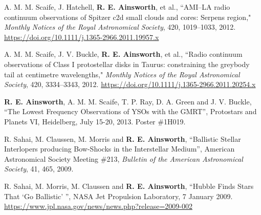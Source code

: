 \begin{cvpubs}
{\begin{cvetar}
\item {A. M. M. Scaife, J. Hatchell, \textbf{R. E. Ainsworth}, et al., ``AMI--LA radio continuum observations of Spitzer c2d small clouds and cores: Serpens region," \textit{Monthly Notices of the Royal Astronomical Society}, 420, 1019--1033, 2012. \url{https://doi.org/10.1111/j.1365-2966.2011.19957.x}}
\item {A. M. M. Scaife, J. V. Buckle, \textbf{R. E. Ainsworth}, et al., ``Radio continuum observations of Class I protostellar disks in Taurus: constraining the greybody tail at centimetre wavelengths," \textit{Monthly Notices of the Royal Astronomical Society}, 420, 3334--3343, 2012. \url{https://doi.org/10.1111/j.1365-2966.2011.20254.x}}
      \end{cvetar}
    }
\end{cvpubs}

\begin{cvpubs}
  \cvpub
    {
      \begin{cvetar}
        \item {\textbf{R. E. Ainsworth}, A. M. M. Scaife, T. P. Ray, D. A. Green and J. V. Buckle, ``The Lowest Frequency Observations of YSOs with the GMRT'', Protostars and Planets VI, Heidelberg, July 15-20, 2013. Poster \#1H019.}
        \item {R. Sahai, M. Claussen, M. Morris and \textbf{R. E. Ainsworth}, ``Ballistic Stellar Interlopers producing Bow-Shocks in the Interstellar Medium'', American Astronomical Society Meeting \#213, \textit{Bulletin of the American Astronomical Society}, 41, 465, 2009.}
      \end{cvetar}
    }
\end{cvpubs}

\begin{cvpubs}
  \cvpub
    {
      \begin{cvetar}
        \item {R. Sahai, M. Morris, M. Claussen and \textbf{R. E. Ainsworth}, ``Hubble Finds Stars That `Go Ballistic' '', NASA Jet Propulsion Laboratory, 7 January 2009. \url{https://www.jpl.nasa.gov/news/news.php?release=2009-002}}
      \end{cvetar}
    }    
\vspace{-11pt}
\end{cvpubs}

